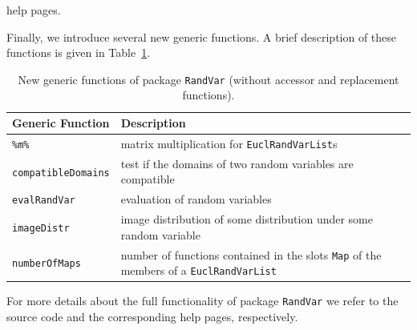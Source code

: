 \documentclass[11pt]{article}
\begin{document}
help pages.
\par
Finally, we introduce several new generic functions. A brief description
of these functions is given in Table~\ref{ap.Rpack.RandVar.tab}.
\begin{table}[!ht]
\begin{center}
\begin{tabular}{p{3.5cm}|p{8cm}}
  \textbf{Generic Function} & \textbf{Description} \\ \hline\hline
  \texttt{\%m\%} & matrix multiplication for {\tt EuclRandVarList}s \\ \hline
  \texttt{compatibleDomains} & test if the domains of two random variables
                     are compatible \\ \hline
  \texttt{evalRandVar} & evaluation of random variables\\ \hline
  \texttt{imageDistr} & image distribution of some distribution under some
               random variable \\ \hline
  \texttt{numberOfMaps} & number of functions contained in the slots {\tt Map}
                 of the members of a {\tt EuclRandVarList}
\end{tabular}
\caption[New Generic Functions of Package {\tt RandVar}]
{New generic functions of package {\tt RandVar} (without accessor
and replacement functions).}\label{ap.Rpack.RandVar.tab}%
\end{center}
\end{table}
\par\noindent
For more details about the full functionality of package {\tt RandVar}
we refer to the source code and the corresponding help pages, respectively.
\end{document}
